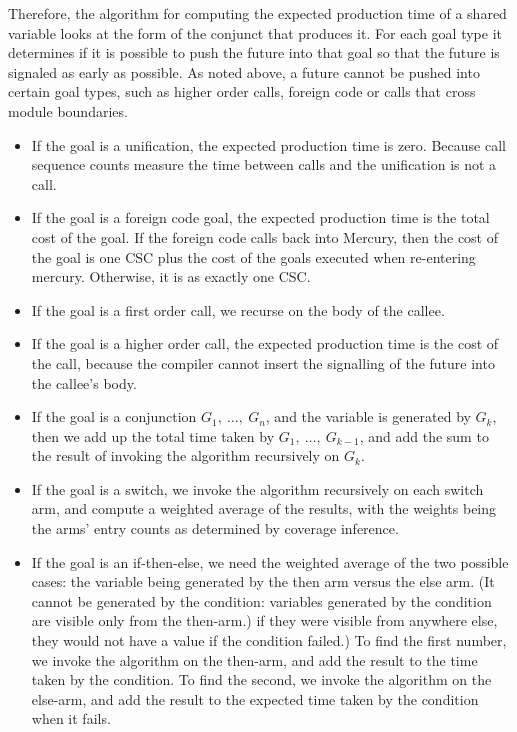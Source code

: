 Therefore,
the algorithm for computing the expected production time
of a shared variable looks at the form of the conjunct that produces it.
For each goal type it determines if it is possible to push the future
into that goal so that the future is signaled as early as possible.
As noted above,
a future cannot be pushed into certain goal types,
such as higher order calls, foreign code or calls that cross module
boundaries.

\begin{itemize}
\item
If the goal is a unification,
the expected production time is zero.
Because call sequence counts measure the time between calls
and the unification is not a call. 
\item
If the goal is a foreign code goal,
the expected production time is the total cost of the goal.
If the foreign code calls back into Mercury,
then the cost of the goal is one CSC plus the cost of the goals executed
when re-entering mercury.
Otherwise, it is as exactly one CSC.
\item
If the goal is a first order call,
we recurse on the body of the callee.
\item
If the goal is a higher order call,
the expected production time is the cost of the call,
because the compiler cannot insert
the signalling of the future into the callee's body.
\item
If the goal is a conjunction $G_1,~\ldots,~G_n$,
and the variable is generated by $G_k$,
then we add up the total time taken by $G_1,~\ldots,~G_{k-1}$,
and add the sum to the result of invoking the algorithm recursively on $G_k$.
\item
If the goal is a switch,
we invoke the algorithm recursively on each switch arm,
and compute a weighted average of the results,
with the weights being the arms' entry counts as determined by coverage
inference.
\item
If the goal is an if-then-else,
we need the weighted average of the two possible cases:
the variable being generated by the then arm versus the else arm.
(It cannot be generated by the condition:
variables generated by the condition are visible only from the then-arm.)
if they were visible from anywhere else,
they would not have a value if the condition failed.)
To find the first number,
we invoke the algorithm on the then-arm,
and add the result to the time taken by the condition.
To find the second,
we invoke the algorithm on the else-arm,
and add the result to the expected time taken by the condition when it fails.

\end{itemize}
